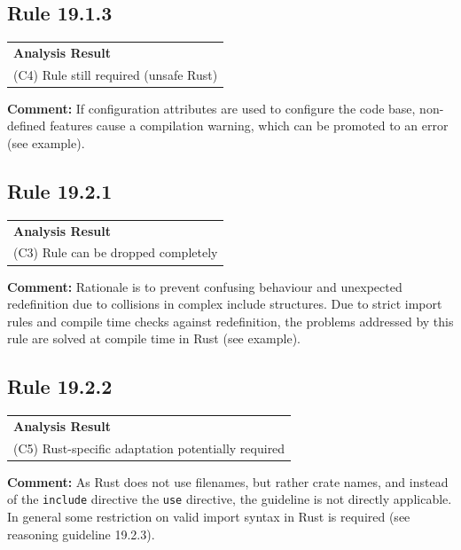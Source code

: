 \subsection*{Rule 19.1.3}
\begin{longtable}{p{13cm}}
\textbf{Analysis Result} \\
(C4) Rule still required (unsafe Rust) \\
\end{longtable}
\textbf{Comment:} If configuration attributes are used to configure the code base, non-defined features cause a compilation warning, which can be promoted to an error (see example). \\


\subsection*{Rule 19.2.1}
\begin{longtable}{p{13cm}}
\textbf{Analysis Result} \\
(C3) Rule can be dropped completely \\
\end{longtable}
\textbf{Comment:} Rationale is to prevent confusing behaviour and unexpected redefinition due to collisions in complex include structures. Due to strict import rules and compile time checks against redefinition, the problems addressed by this rule are solved at compile time in Rust (see example). \\


\subsection*{Rule 19.2.2}
\begin{longtable}{p{13cm}}
\textbf{Analysis Result} \\
(C5) Rust-specific adaptation potentially required \\
\end{longtable}
\textbf{Comment:} As Rust does not use filenames, but rather crate names, and instead of the \texttt{include} directive the \texttt{use} directive, the guideline is not directly applicable. In general some restriction on valid import syntax in Rust is required (see reasoning guideline 19.2.3). \\
